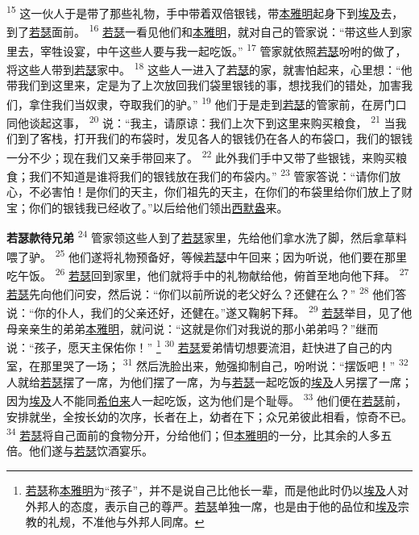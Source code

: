 \textsuperscript{15}
这一伙人于是带了那些礼物，手中带着双倍银钱，带\uline{本雅明}起身下到\uline{埃及}去，到了\uline{若瑟}面前。
\textsuperscript{16}
\uline{若瑟}一看见他们和\uline{本雅明}，就对自己的管家说：“带这些人到家里去，宰牲设宴，中午这些人要与我一起吃饭。”
\textsuperscript{17}
管家就依照\uline{若瑟}吩咐的做了，将这些人带到\uline{若瑟}家中。
\textsuperscript{18}
这些人一进入了\uline{若瑟}的家，就害怕起来，心里想：“他带我们到这里来，定是为了上次放回我们袋里银钱的事，想找我们的错处，加害我们，拿住我们当奴隶，夺取我们的驴。”
\textsuperscript{19}
他们于是走到\uline{若瑟}的管家前，在房门口同他谈起这事，
\textsuperscript{20}
说：“我主，请原谅：我们上次下到这里来购买粮食，
\textsuperscript{21}
当我们到了客栈，打开我们的布袋时，发见各人的银钱仍在各人的布袋口，我们的银钱一分不少；现在我们又亲手带回来了。
\textsuperscript{22}
此外我们手中又带了些银钱，来购买粮食；我们不知道是谁将我们的银钱放在我们的布袋内。”
\textsuperscript{23}
管家答说：“请你们放心，不必害怕！是你们的天主，你们祖先的天主，在你们的布袋里给你们放上了财宝；你们的银钱我已经收了。”以后给他们领出\uline{西默盎}来。

\textbf{若瑟款待兄弟\quad}
\textsuperscript{24}
管家领这些人到了\uline{若瑟}家里，先给他们拿水洗了脚，然后拿草料喂了驴。
\textsuperscript{25}
他们遂将礼物预备好，等候\uline{若瑟}中午回来；因为听说，他们要在那里吃午饭。
\textsuperscript{26}
\uline{若瑟}回到家里，他们就将手中的礼物献给他，俯首至地向他下拜。
\textsuperscript{27}
\uline{若瑟}先向他们问安，然后说：“你们以前所说的老父好么？还健在么？”
\textsuperscript{28}
他们答说：“你的仆人，我们的父亲还好，还健在。”遂又鞠躬下拜。
\textsuperscript{29}
\uline{若瑟}举目，见了他母亲亲生的弟弟\uline{本雅明}，就问说：“这就是你们对我说的那小弟弟吗？”继而说：“孩子，愿天主保佑你！”
\footnote{\uline{若瑟}称\uline{本雅明}为“孩子”，并不是说自己比他长一辈，而是他此时仍以\uline{埃及}人对外邦人的态度，表示自己的尊严。\uline{若瑟}单独一席，也是由于他的品位和\uline{埃及}宗教的礼规，不准他与外邦人同席。}
\textsuperscript{30}
\uline{若瑟}爱弟情切想要流泪，赶快进了自己的内室，在那里哭了一场；
\textsuperscript{31}
然后洗脸出来，勉强抑制自己，吩咐说：“摆饭吧！”
\textsuperscript{32}
人就给\uline{若瑟}摆了一席，为他们摆了一席，为与\uline{若瑟}一起吃饭的\uline{埃及}人另摆了一席；因为\uline{埃及}人不能同\uline{希伯来}人一起吃饭，这为他们是个耻辱。
\textsuperscript{33}
他们便在\uline{若瑟}前，安排就坐，全按长幼的次序，长者在上，幼者在下；众兄弟彼此相看，惊奇不已。
\textsuperscript{34}
\uline{若瑟}将自己面前的食物分开，分给他们；但\uline{本雅明}的一分，比其余的人多五倍。他们遂与\uline{若瑟}饮酒宴乐。

